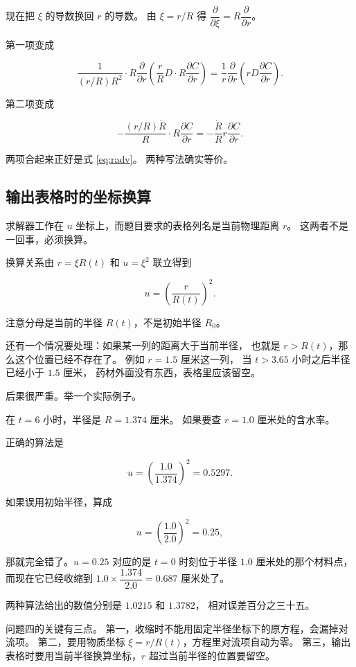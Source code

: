 现在把 $\xi$ 的导数换回 $r$ 的导数。
由 $\xi=r/R$ 得 $\dfrac{\partial}{\partial \xi}=R\dfrac{\partial}{\partial r}$。

第一项变成

\begin{equation}
\frac{1}{(r/R)R^2}\cdot R\frac{\partial}{\partial r}
\left(\frac{r}{R}D\cdot R\frac{\partial C}{\partial r}\right)
= \frac{1}{r}\frac{\partial}{\partial r}\left(rD\frac{\partial C}{\partial r}\right).
\end{equation}

第二项变成

\begin{equation}
-\frac{(r/R)\dot R}{R}\cdot R\frac{\partial C}{\partial r}
= -\frac{\dot R}{R}r\frac{\partial C}{\partial r}.
\end{equation}

两项合起来正好是式 \eqref{eq:radv}。
两种写法确实等价。

\subsection{输出表格时的坐标换算}

求解器工作在 $u$ 坐标上，而题目要求的表格列名是当前物理距离 $r$。
这两者不是一回事，必须换算。

换算关系由 $r=\xi R(t)$ 和 $u=\xi^2$ 联立得到

\begin{equation}
u = \left(\frac{r}{R(t)}\right)^2 .
\label{eq:outputmap}
\end{equation}

注意分母是当前的半径 $R(t)$，不是初始半径 $R_0$。

还有一个情况要处理：如果某一列的距离大于当前半径，
也就是 $r>R(t)$，那么这个位置已经不存在了。
例如 $r=1.5$ 厘米这一列，
当 $t>3.65$ 小时之后半径已经小于 $1.5$ 厘米，
药材外面没有东西，表格里应该留空。

后果很严重。举一个实际例子。

在 $t=6$ 小时，半径是 $R=1.374$ 厘米。
如果要查 $r=1.0$ 厘米处的含水率。

正确的算法是

\begin{equation}
u = \left(\frac{1.0}{1.374}\right)^2 = 0.5297 .
\end{equation}

如果误用初始半径，算成

\begin{equation}
u = \left(\frac{1.0}{2.0}\right)^2 = 0.25 ,
\end{equation}

那就完全错了。$u=0.25$ 对应的是 $t=0$ 时刻位于半径 $1.0$ 厘米处的那个材料点，
而现在它已经收缩到 $1.0\times\dfrac{1.374}{2.0}=0.687$ 厘米处了。

两种算法给出的数值分别是 $1.0215$ 和 $1.3782$，
相对误差百分之三十五。

\keypoint
问题四的关键有三点。
第一，收缩时不能用固定半径坐标下的原方程，会漏掉对流项。
第二，要用物质坐标 $\xi=r/R(t)$，方程里对流项自动为零。
第三，输出表格时要用当前半径换算坐标，$r$ 超过当前半径的位置要留空。
